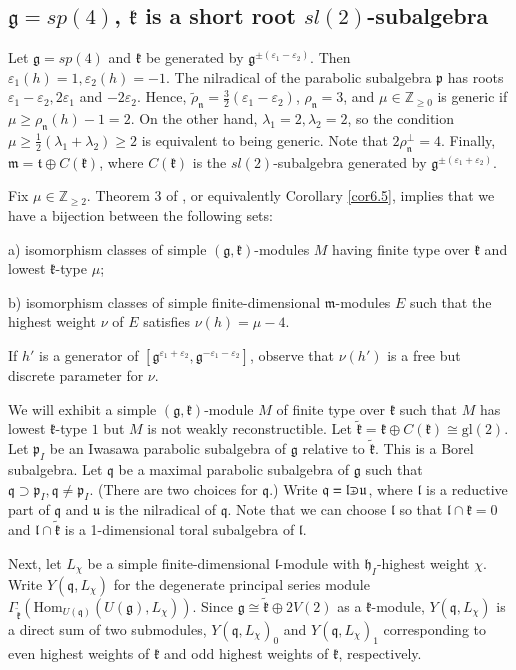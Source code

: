 \documentclass[11pt]{amsart}
\renewcommand{\tt}{\mathfrak{t}}
\newcommand{\kk}{\mathfrak{k}}
\newcommand{\nn}{\mathfrak{n}}
\newcommand{\mm}{\mathfrak{m}}
\newcommand{\hh}{\mathfrak{h}}
\newcommand{\qq}{\mathfrak{q}}
\newcommand{\pp}{\mathfrak{p}}
\renewcommand{\gg}{\mathfrak{g}}
\newcommand{\uu}{\mathfrak{u}}
\renewcommand{\ll}{\mathfrak{l}}
\newcommand{\refcor}[1]{Corollary \ref{#1}}
\newcommand{\Hom}{\mathrm{Hom}}
\newcommand{\field}[1]{\mathbb{#1}}
\def\crplus{\hbox{$\supset${\raise1.05pt\hbox{\kern -0.55em ${\scriptscriptstyle +}$}}\ }}
\begin{document}
\subsection{$\gg=sp(4)$, $\kk$ is a short root $sl(2)$-subalgebra} %

Let $\gg=sp(4)$ and $\kk$ be generated by $\gg^{\pm(\varepsilon_1-\varepsilon_2)}$. Then $\varepsilon_1(h)=1,\varepsilon_2(h)=-1$. The nilradical of the parabolic subalgebra $\pp$ has roots $\varepsilon_1-\varepsilon_2,2\varepsilon_1$ and $-2\varepsilon_2$. Hence, $\tilde{\rho}_\nn=\frac{3}{2}(\varepsilon_1-\varepsilon_2)$, $\rho_\nn=3$, and $\mu\in\field{Z}_{\geq 0}$ is generic if $\mu\geq\rho_\nn(h)-1=2$. On the other hand, $\lambda_1=2,\lambda_2=2$, so the condition $\mu\geq\frac{1}{2}(\lambda_1+\lambda_2)\geq 2$ is equivalent to being generic. Note that $2\rho_\nn^\perp=4$. Finally, $\mm=\tt\oplus C(\kk)$, where $C(\kk)$ is the $sl(2)$-subalgebra generated by $\gg^{\pm(\varepsilon_1+\varepsilon_2)}$.

Fix $\mu\in\field{Z}_{\geq 2}$. Theorem 3 of \cite{PZ2}, or equivalently \refcor{cor6.5},  implies that we have a bijection between the following sets:

a) isomorphism classes of simple $(\gg,\kk)$-modules $M$ having finite type over $\kk$ and lowest $\kk$-type $\mu$;

b) isomorphism classes of simple finite-dimensional $\mm$-modules $E$ such that the highest weight $\nu$ of $E$ satisfies $\nu(h)=\mu-4$. 

If $h'$ is a generator of $[\gg^{\varepsilon_1+\varepsilon_2},\gg^{-\varepsilon_1-\varepsilon_2}]$, observe that $\nu(h')$ is a free but discrete parameter for $\nu$.

We will exhibit a simple $(\gg,\kk)$-module $M$ of finite type over $\kk$ such that $M$ has lowest $\kk$-type $1$ but $M$ is not weakly reconstructible. Let $\tilde{\kk}=\kk\oplus C(\kk)\cong\mathrm{gl}(2)$. Let $\pp_I$ be an Iwasawa parabolic subalgebra of $\gg$ relative to $\tilde{\kk}$. This is a Borel subalgebra. Let $\qq$ be a maximal parabolic subalgebra of $\gg$ such that $\qq\supset\pp_I,\qq\neq\pp_I.$ (There are two choices for $\qq$.) Write $\qq=\ll\crplus\uu$, where $\ll$ is a reductive part of $\qq$ and $\uu$ is the nilradical of $\qq$. Note that we can choose $\ll$ so that $\ll\cap\kk=0$ and $\ll\cap\tilde{\kk}$ is a 1-dimensional toral subalgebra of $\ll$.

Next, let $L_\chi$ be a simple finite-dimensional $\ll$-module with $\hh_I$-highest weight $\chi$. Write $Y(\qq,L_\chi)$ for the degenerate principal series module $\Gamma_{\tilde{\kk}}(\Hom_{U(\qq)}(U(\gg),L_\chi))$. Since $\gg\cong\tilde{\kk}\oplus 2V(2)$ as a $\kk$-module, $Y(\qq,L_\chi)$ is a direct sum of two submodules, $Y(\qq,L_\chi)_0$ and $Y(\qq,L_\chi)_1$ corresponding to even highest weights of $\kk$ and odd highest weights of $\kk$, respectively.
\end{document}
